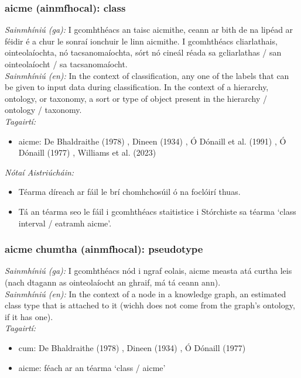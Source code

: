 \documentclass{article}
\begin{document}
\subsubsection*{aicme (ainmfhocal): class}
 \noindent \textit{Sainmhíniú (ga):} I gcomhthéacs an taisc aicmithe, ceann ar bith de na lipéad ar féidir é a chur le sonraí ionchuir le linn aicmithe. I gcomhthéacs cliarlathais, ointeolaíochta, nó tacsanomaíochta, sórt nó cineál réada sa gcliarlathas / san ointeolaíocht / sa tacsanomaíocht.
\\
 \noindent \textit{Sainmhíniú (en):} In the context of classification, any one of the labels that can be given to input data during classification. In the context of a hierarchy, ontology, or taxonomy, a sort or type of object present in the hierarchy / ontology / taxonomy.
\\
 \noindent \textit{Tagairtí:}
\begin{itemize}
	\item aicme: De Bhaldraithe (1978) \cite{de-bhaldraithe}, Dineen (1934) \cite{dineen}, Ó Dónaill et al. (1991) \cite{focloir-beag}, Ó Dónaill (1977) \cite{odonaill}, Williams et al. (2023) \cite{storchiste}
\end{itemize}

 \noindent \textit{Nótaí Aistriúcháin:}
\begin{itemize}
	\item Téarma díreach ar fáil le brí chomhchosúil ó na foclóirí thuas.
	\item Tá an téarma seo le fáil i gcomhthéacs staitistice i Stórchiste sa téarma `class interval / eatramh aicme'.
\end{itemize}


\subsubsection*{aicme chumtha (ainmfhocal): pseudotype}
 \noindent \textit{Sainmhíniú (ga):} I gcomhthéacs nód i ngraf eolais, aicme measta atá curtha leis (nach dtagann as ointeolaíocht an ghraif, má tá ceann ann).
\\
 \noindent \textit{Sainmhíniú (en):} In the context of a node in a knowledge graph, an estimated class type that is attached to it (wichh does not come from the graph's ontology, if it has one).
\\
 \noindent \textit{Tagairtí:}
\begin{itemize}
	\item cum: De Bhaldraithe (1978) \cite{de-bhaldraithe}, Dineen (1934) \cite{dineen}, Ó Dónaill (1977) \cite{odonaill}
	\item aicme: féach ar an téarma `class / aicme'
\end{itemize}
\end{document}
